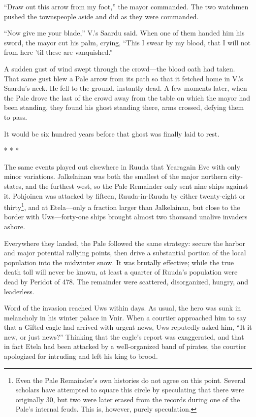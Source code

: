 \documentclass[12pt]{report}
\begin{document}
``Draw out this arrow from my foot,'' the mayor commanded.  The two
watchmen pushed the townspeople aside and did as they were commanded.

``Now give me your blade,'' V.'s Saardu said.  When one of them handed
him his sword, the mayor cut his palm, crying, ``This I swear by my
blood, that I will not from here 'til these are vanquished.''

A sudden gust of wind swept through the crowd---the blood oath had
taken.  That same gust blew a Pale arrow from its path so that it
fetched home in V.'s Saardu's neck.  He fell to the ground, instantly
dead.  A few moments later, when the Pale drove the last of the crowd
away from the table on which the mayor had been standing, they found
his ghost standing there, arms crossed, defying them to pass.

It would be six hundred years before that ghost was finally laid to
rest.

\begin{center}
* * *
\end{center}

The same events played out elsewhere in Ruuda that Yearagain Eve with
only minor variations.  Jalkelainan was both the smallest of the major
northern city-states, and the furthest west, so the Pale Remainder
only sent nine ships against it.  Pohjoinen was attacked by fifteen,
Ruuda-in-Ruuda by either twenty-eight or thirty\footnote{Even the Pale
Remainder's own histories do not agree on this point.  Several
scholars have attempted to square this circle by speculating that
there were originally 30, but two were later erased from the records
during one of the Pale's internal feuds.  This is, however, purely
speculation.}, and at Etela---only a fraction larger than Jalkelainan,
but close to the border with Uws---forty-one ships brought almost two
thousand unalive invaders ashore.

Everywhere they landed, the Pale followed the same strategy: secure
the harbor and major potential rallying points, then drive a
substantial portion of the local population into the midwinter snow.
It was brutally effective; while the true death toll will never be
known, at least a quarter of Ruuda's population were dead by Peridot
of 478.  The remainder were scattered, disorganized, hungry, and
leaderless.

Word of the invasion reached Uws within days.  As usual, the hero was
sunk in melancholy in his winter palace in Vnir.  When a courtier
approached him to say that a Gifted eagle had arrived with urgent
news, Uws reputedly asked him, ``It it new, or just news?''  Thinking
that the eagle's report was exaggerated, and that in fact Etela had
been attacked by a well-organized band of pirates, the courtier
apologized for intruding and left his king to brood.
\end{document}
